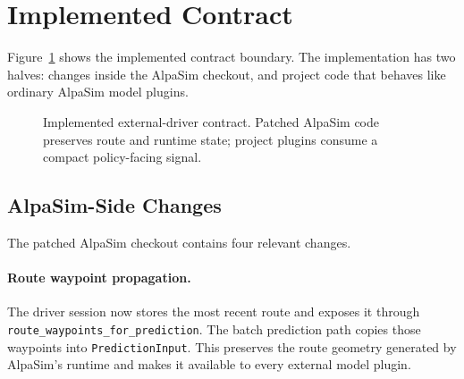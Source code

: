 \documentclass{article}
\begin{document}
\section{Implemented Contract}

Figure~\ref{fig:architecture} shows the implemented contract boundary. The implementation
has two halves: changes inside the AlpaSim checkout, and project code that behaves like
ordinary AlpaSim model plugins.

\begin{figure}[t]
\centering
{}
\caption{Implemented external-driver contract. Patched AlpaSim code preserves route and
runtime state; project plugins consume a compact policy-facing signal.}
\label{fig:architecture}
\end{figure}

\subsection{AlpaSim-Side Changes}

The patched AlpaSim checkout contains four relevant changes.

\paragraph{Route waypoint propagation.}
The driver session now stores the most recent route and exposes it through
\texttt{route\_waypoints\_for\_prediction}. The batch prediction path copies those
waypoints into \texttt{PredictionInput}. This preserves the route geometry generated by
AlpaSim's runtime and makes it available to every external model plugin.
\end{document}
